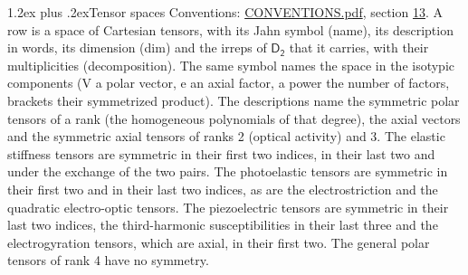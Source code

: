 \documentclass[10pt,a4paper]{article}
\makeatletter
\renewcommand\section{\@startsection{section}{1}{\z@}{-3ex plus -1ex minus -.2ex}%
  {1.2ex plus .2ex}{\normalfont\large\sffamily\bfseries\color{parttitle}}}
\numberwithin{equation}{section}
\newcommand{\grp}[1]{\mathsf{#1}}
\makeatother
\begin{document}
\section{Tensor spaces}\label{s:tensor_spaces}
Conventions: \href{../../CONVENTIONS.pdf}{CONVENTIONS.pdf}, section \href{../../CONVENTIONS.pdf\#conv.13}{13}.
\leavevmode\label{n:head.name}\label{n:head.description}\label{n:head.dim}\label{n:head.decomposition}A row is a space of Cartesian tensors, with its Jahn symbol (name), its description in words, its dimension (dim) and the irreps of $\grp{D_{2}}$ that it carries, with their multiplicities (decomposition). \label{n:label.jahn}The same symbol names the space in the isotypic components (V a polar vector, e an axial factor, a power the number of factors, brackets their symmetrized product). The descriptions name the symmetric polar tensors of a rank (the homogeneous polynomials of that degree), the axial vectors and the symmetric axial tensors of ranks 2 (optical activity) and 3. The elastic stiffness tensors are symmetric in their first two indices, in their last two and under the exchange of the two pairs. The photoelastic tensors are symmetric in their first two and in their last two indices, as are the electrostriction and the quadratic electro-optic tensors. The piezoelectric tensors are symmetric in their last two indices, the third-harmonic susceptibilities in their last three and the electrogyration tensors, which are axial, in their first two. The general polar tensors of rank 4 have no symmetry.
\end{document}
